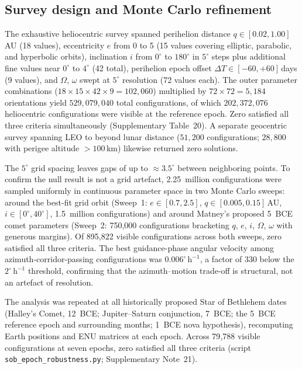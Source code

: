 \documentclass[sn-nature]{sn-jnl}
\begin{document}
\subsection{Survey design and Monte Carlo refinement}

The exhaustive heliocentric survey spanned perihelion distance $q\in[0.02,
1.00]$\,AU (18 values), eccentricity $e$ from 0 to 5 (15 values covering
elliptic, parabolic, and hyperbolic orbits), inclination $i$ from $0^\circ$
to $180^\circ$ in $5^\circ$ steps plus additional fine values near $0^\circ$
to $4^\circ$ (42 total), perihelion epoch offset $\Delta T\in[-60,+60]$\,days
(9 values), and $\Omega$, $\omega$ swept at $5^\circ$ resolution (72 values
each). The outer parameter combinations ($18\times15\times42\times9 =
102{,}060$) multiplied by $72\times72=5{,}184$ orientations yield
$529{,}079{,}040$ total configurations, of which $202{,}372{,}076$ heliocentric configurations were
visible at the reference epoch. Zero satisfied all three criteria
simultaneously (Supplementary Table~20). A separate geocentric survey
spanning LEO to beyond lunar distance ($51{,}200$ configurations;
$28{,}800$ with perigee altitude $>100$\,km) likewise returned zero
solutions.

The $5^\circ$ grid spacing leaves gaps of up to ${\approx}3.5^\circ$
between neighboring points. To confirm the null result is not a grid
artefact, 2.25~million configurations were sampled uniformly in continuous
parameter space in two Monte Carlo sweeps: around the best-fit grid orbit
(Sweep~1: $e\in[0.7,2.5]$, $q\in[0.005,0.15]$\,AU, $i\in[0^\circ,40^\circ]$,
1.5~million configurations) and around Matney's proposed 5~BCE comet
parameters (Sweep~2: 750{,}000 configurations bracketing $q$, $e$, $i$,
$\Omega$, $\omega$ with generous margins). Of 895{,}822 visible
configurations across both sweeps, zero satisfied all three criteria.
The best guidance-phase angular velocity among azimuth-corridor-passing
configurations was $0.006^\circ\,\mathrm{h}^{-1}$, a factor of 330 below
the $2^\circ\,\mathrm{h}^{-1}$ threshold, confirming that the
azimuth--motion trade-off is structural, not an artefact of resolution.

The analysis was repeated at all historically proposed Star of Bethlehem
dates (Halley's Comet, 12~BCE; Jupiter--Saturn conjunction, 7~BCE;
the 5~BCE reference epoch and surrounding months; 1~BCE nova hypothesis),
recomputing Earth positions and ENU matrices at each epoch.
Across 79{,}788 visible configurations at seven epochs, zero satisfied all
three criteria (script \texttt{sob\_epoch\_robustness.py}; Supplementary Note~21).
\end{document}
